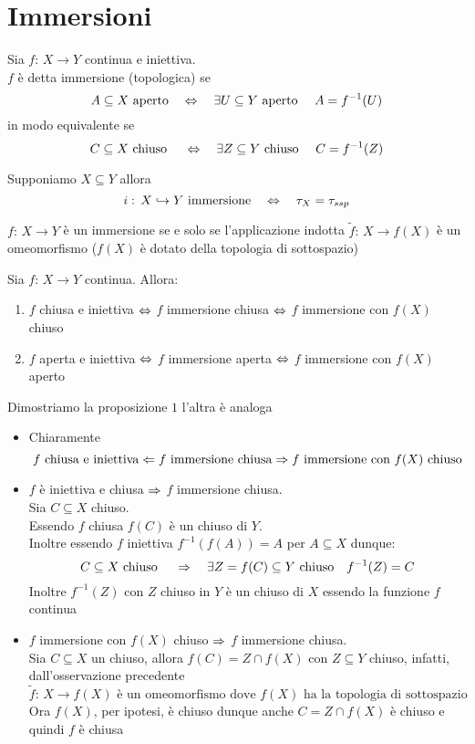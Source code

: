 \section{Immersioni}
\begin{defn}[Immersione]\bianco
Sia $f:\, X \to Y$ continua e iniettiva.\\
$f$ \`e detta immersione (topologica) se 
$$ A \subseteq X \text{ aperto} \quad \Leftrightarrow \quad \exists U \subseteq Y \text{ aperto } \quad A=f^{-1}(U)$$
in modo equivalente se 
$$ C \subseteq X \text{ chiuso } \quad \Leftrightarrow \quad \exists Z\subseteq Y \text{ chiuso } \quad C=f^{-1}(Z)$$
\end{defn}
\begin{ese}Supponiamo $X\subseteq Y$ allora 
$$i:\, X \hookrightarrow Y \text{ immersione} \quad \Leftrightarrow \quad \tau_X = \tau_{ssp}$$
\end{ese}
\begin{oss}$f:\, X \to Y $ \`e un immersione se e solo se l'applicazione indotta $\tilde{f}:\, X \to f(X)$ \`e un omeomorfismo ($f(X)$ \`e dotato della topologia di sottospazio)
\end{oss}
\begin{prop}Sia $f:\,X \to Y $ continua. Allora:
\begin{enumerate}

\item$f$ chiusa e iniettiva $\Leftrightarrow$ $f$ immersione chiusa $\Leftrightarrow$ $f$ immersione con $f(X)$ chiuso
\item $f$ aperta e iniettiva $\Leftrightarrow$ $f$ immersione aperta $\Leftrightarrow$ $f$ immersione con $f(X)$ aperto 
\end{enumerate}
\proof Dimostriamo la proposizione $1$ l'altra \`e analoga
\begin{itemize}
\item 
Chiaramente 
$$ f \text{ chiusa e iniettiva} \Leftarrow f \text{ immersione chiusa} \Rightarrow f \text{ immersione con } f(X)  \text{ chiuso}$$
\item $f$ \`e iniettiva e chiusa $\Rightarrow$ $f$ immersione chiusa.\\
Sia $C \subseteq X $ chiuso.\\ 
Essendo $f$ chiusa  $f(C)$ \`e un chiuso di $Y$.\\
Inoltre essendo $f$ iniettiva $f^{-1}(f(A))=A $ per $A\subseteq X$ dunque:
$$  C \subseteq X \text{ chiuso }  \quad \Rightarrow \quad \exists Z=f(C)\subseteq   Y \text{ chiuso} \quad f^{-1}(Z)=C$$
Inoltre $f^{-1}(Z) $ con $Z$ chiuso in $Y$ \`e un chiuso di $X$ essendo la funzione $f$ continua
\item $f$ immersione con $f(X)$ chiuso $\Rightarrow$ $f$ immersione chiusa.\\
Sia $C\subseteq X$ un chiuso, allora $f(C)= Z \cap f(X) $ con $Z\subseteq Y$ chiuso, infatti, dall'osservazione precedente
$$ \tilde{f}:\, X \to f(X) \text{ \`e un omeomorfismo dove } f(X) \text{ ha la topologia di sottospazio} $$
Ora $f(X)$, per ipotesi, \`e chiuso dunque anche $C=Z\cap f(X)$ \`e chiuso e quindi $f$ \`e chiusa
\end{itemize}
\endproof
\end{prop}
\newpage
